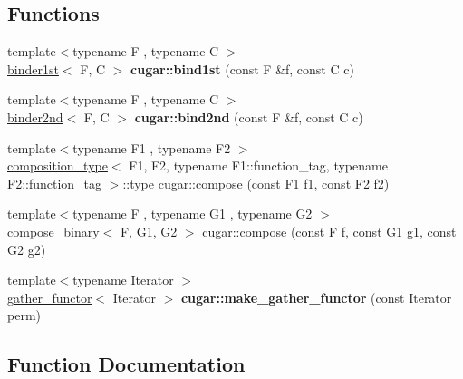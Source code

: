 \subsection*{Functions}
\begin{DoxyCompactItemize}
\item 
\mbox{\label{group___basic_functors_gac0e691c6a1f8ba14c912f00a19c053d9}} 
{\footnotesize template$<$typename F , typename C $>$ }\\\hyperlink{structcugar_1_1binder1st}{binder1st}$<$ F, C $>$ {\bfseries cugar\+::bind1st} (const F \&f, const C c)
\item 
\mbox{\label{group___basic_functors_ga08cd1637715914189f164bf35f36e794}} 
{\footnotesize template$<$typename F , typename C $>$ }\\\hyperlink{structcugar_1_1binder2nd}{binder2nd}$<$ F, C $>$ {\bfseries cugar\+::bind2nd} (const F \&f, const C c)
\item 
{\footnotesize template$<$typename F1 , typename F2 $>$ }\\\hyperlink{structcugar_1_1composition__type}{composition\+\_\+type}$<$ F1, F2, typename F1\+::function\+\_\+tag, typename F2\+::function\+\_\+tag $>$\+::type \hyperlink{group___basic_functors_ga3f7ecfc55f5d92661c8cb23428d52f7b}{cugar\+::compose} (const F1 f1, const F2 f2)
\item 
{\footnotesize template$<$typename F , typename G1 , typename G2 $>$ }\\\hyperlink{structcugar_1_1compose__binary}{compose\+\_\+binary}$<$ F, G1, G2 $>$ \hyperlink{group___basic_functors_gadbd492970eb013a975551b9cf4b846fe}{cugar\+::compose} (const F f, const G1 g1, const G2 g2)
\item 
\mbox{\label{group___basic_functors_ga9ddc5a46d21892ed104592b370f67011}} 
{\footnotesize template$<$typename Iterator $>$ }\\\hyperlink{structcugar_1_1gather__functor}{gather\+\_\+functor}$<$ Iterator $>$ {\bfseries cugar\+::make\+\_\+gather\+\_\+functor} (const Iterator perm)
\end{DoxyCompactItemize}


\subsection{Function Documentation}
\mbox{\label{group___basic_functors_ga3f7ecfc55f5d92661c8cb23428d52f7b}} 
